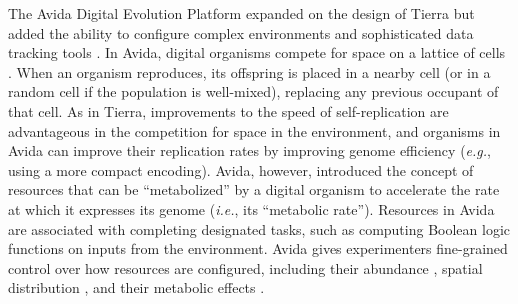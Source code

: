 
The Avida Digital Evolution Platform expanded on the design of Tierra but added the ability to configure complex environments and sophisticated data tracking tools  \citep{adami_evolutionary_1994,ofria_avida_2004,ofria_avida:_2009}.
In Avida, digital organisms compete for space on a lattice of cells \citep{ofria_avida:_2009}.
When an organism reproduces, its offspring is placed in a nearby cell (or in a random cell if the population is well-mixed), replacing any previous occupant of that cell.
As in Tierra, improvements to the speed of self-replication are advantageous in the competition for space in the environment, and organisms in Avida can improve their replication rates by improving genome efficiency (\textit{e.g.}, using a more compact encoding).
Avida, however, introduced the concept of resources that can be ``metabolized'' by a digital organism to accelerate the rate at which it expresses its genome (\textit{i.e.}, its ``metabolic rate'').
Resources in Avida are associated with completing designated tasks, such as computing Boolean logic functions on inputs from the environment. 
Avida gives experimenters fine-grained control over how resources are configured, including their abundance \citep{cooper_evolution_2002}, spatial distribution \citep{dolson_spatial_2017}, and their metabolic effects \citep{canino-koning_evolution_2016,canino-koning_fluctuating_2019}.

